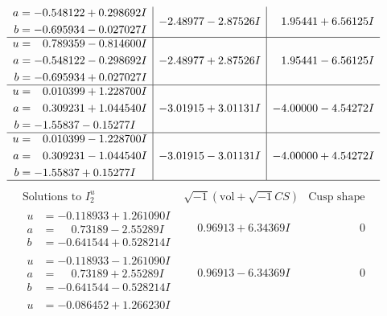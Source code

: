 \documentclass[1p]{elsarticle_modified}
\theoremstyle{definition}
\newcommand{\I}{\sqrt{-1}}
\begin{document}
$$\begin{array}{c|c|c}
\begin{aligned}
a &= -0.548122 + 0.298692 I \\
b &= -0.695934 - 0.027027 I\end{aligned}
 & -2.48977 - 2.87526 I & \phantom{-}1.95441 + 6.56125 I \\ \hline\begin{aligned}
u &= \phantom{-}0.789359 - 0.814600 I \\
a &= -0.548122 - 0.298692 I \\
b &= -0.695934 + 0.027027 I\end{aligned}
 & -2.48977 + 2.87526 I & \phantom{-}1.95441 - 6.56125 I \\ \hline\begin{aligned}
u &= \phantom{-}0.010399 + 1.228700 I \\
a &= \phantom{-}0.309231 + 1.044540 I \\
b &= -1.55837 - 0.15277 I\end{aligned}
 & -3.01915 + 3.01131 I & -4.00000 - 4.54272 I \\ \hline\begin{aligned}
u &= \phantom{-}0.010399 - 1.228700 I \\
a &= \phantom{-}0.309231 - 1.044540 I \\
b &= -1.55837 + 0.15277 I\end{aligned}
 & -3.01915 - 3.01131 I & -4.00000 + 4.54272 I\\
 \hline 
 \end{array}$$\newpage$$\begin{array}{c|c|c}  
\text{Solutions to }I^u_{2}& \I (\text{vol} + \sqrt{-1}CS) & \text{Cusp shape}\\
 \hline 
\begin{aligned}
u &= -0.118933 + 1.261090 I \\
a &= \phantom{-}0.73189 - 2.55289 I \\
b &= -0.641544 + 0.528214 I\end{aligned}
 & \phantom{-}0.96913 + 6.34369 I & \phantom{-0.000000 } 0 \\ \hline\begin{aligned}
u &= -0.118933 - 1.261090 I \\
a &= \phantom{-}0.73189 + 2.55289 I \\
b &= -0.641544 - 0.528214 I\end{aligned}
 & \phantom{-}0.96913 - 6.34369 I & \phantom{-0.000000 } 0 \\ \hline\begin{aligned}
u &= -0.086452 + 1.266230 I \\

\end{aligned}
\end{array}$$
\end{document}

